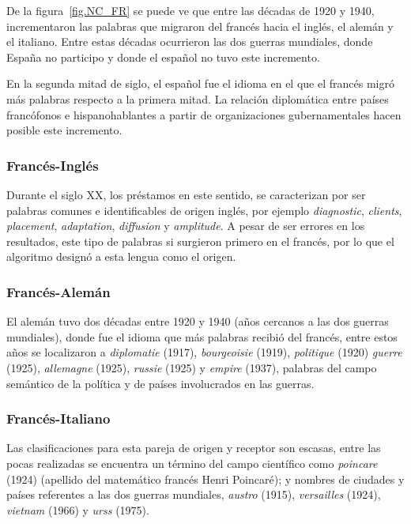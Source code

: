 De la figura~\ref{fig.NC_FR} se puede ve que entre las décadas de 1920 y 1940, incrementaron las palabras que migraron del francés hacia  el inglés, el alemán y el italiano.  Entre estas décadas ocurrieron las dos guerras mundiales, donde España no participo y donde el español no tuvo este incremento. 

En la segunda mitad de siglo, el español fue el idioma en el que el francés migró más palabras respecto a la primera mitad. La relación diplomática entre países francófonos e hispanohablantes a partir de organizaciones gubernamentales  hacen posible este incremento. 


\subsubsection*{Francés-Inglés}%

Durante el siglo XX, los préstamos en este sentido, se caracterizan por ser palabras comunes e identificables de origen inglés,  por ejemplo  \textit{diagnostic}, \textit{clients}, \textit{placement}, \textit{adaptation}, \textit{diffusion} y \textit{amplitude}.  A pesar de ser errores en los resultados, este tipo de palabras si surgieron primero en el francés, por lo que el algoritmo designó a esta lengua como el origen. 

\subsubsection*{Francés-Alemán}%

El alemán tuvo dos décadas entre 1920 y 1940  (años cercanos a las dos guerras mundiales), donde  fue el idioma que más palabras recibió del francés, entre estos años se localizaron a \textit{diplomatie} (1917), \textit{bourgeoisie} (1919), \textit{politique} (1920)  \textit{guerre} (1925), \textit{allemagne} (1925), \textit{russie} (1925) y \textit{empire} (1937), palabras del campo semántico de la política y de países involucrados en las guerras. 



\subsubsection*{Francés-Italiano}%

Las clasificaciones para esta pareja de origen y receptor son escasas, entre las pocas realizadas se encuentra un término del campo científico como \textit{poincare} (1924) (apellido del matemático francés Henri Poincaré);  y nombres de ciudades y países referentes a las dos guerras mundiales, \textit{austro} (1915), \textit{versailles} (1924), \textit{vietnam} (1966)  y \textit{urss} (1975).


